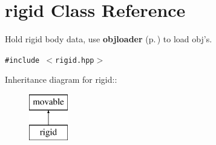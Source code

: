 \section{rigid  Class Reference}
\label{classrigid}
Hold rigid body data, use {\bf objloader} {\rm (p.\,\pageref{classobjloader})} to load obj's. 


{\tt \#include $<$rigid.hpp$>$}

Inheritance diagram for rigid::\begin{figure}[H]
\begin{center}
\leavevmode
\includegraphics[height=2cm]{classrigid}
\end{center}
\end{figure}
